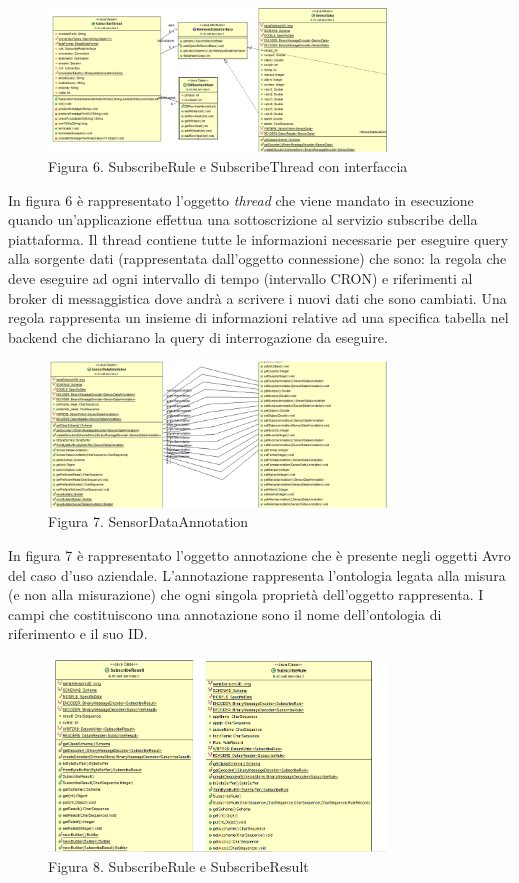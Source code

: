 \clearpage
\begin{figure}[h]
	\centering
	\includegraphics[width=0.8\textwidth]{subscribe-thread.png}
	\caption*{Figura 6. SubscribeRule e SubscribeThread con interfaccia}
\end{figure}
In figura 6 è rappresentato l’oggetto \textit{thread} che viene mandato in esecuzione quando un'applicazione effettua una sottoscrizione al servizio subscribe della piattaforma. Il thread contiene tutte le informazioni necessarie per eseguire query alla sorgente dati (rappresentata dall’oggetto connessione) che sono: la regola che deve eseguire ad ogni intervallo di tempo (intervallo CRON) e riferimenti al broker di messaggistica dove andrà a scrivere i nuovi dati che sono cambiati.
Una regola rappresenta un insieme di informazioni relative ad una specifica tabella nel backend che dichiarano la query di interrogazione da eseguire.
\par \vspace*{2em}
\begin{figure}[h]
	\centering
	\includegraphics[width=0.8\textwidth]{sensor-data-annotation.png}
	\caption*{Figura 7. SensorDataAnnotation}
\end{figure}
In figura 7 è rappresentato l’oggetto annotazione che è presente negli oggetti Avro del caso d’uso aziendale. L’annotazione rappresenta l’ontologia legata alla misura (e non alla misurazione) che ogni singola proprietà dell’oggetto rappresenta. I campi che costituiscono una annotazione sono il nome dell’ontologia di riferimento e il suo ID.
\clearpage
\begin{figure}[h]
	\centering
	\includegraphics[width=0.8\textwidth]{subscribe-result.png}
	\caption*{Figura 8. SubscribeRule e SubscribeResult}
\end{figure}
